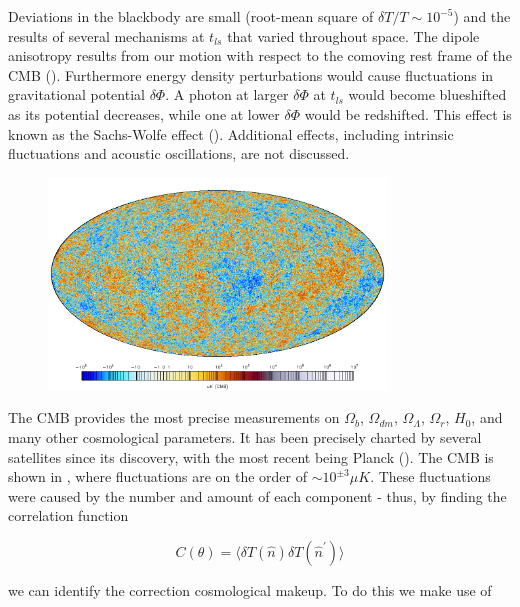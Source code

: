 Deviations in the blackbody are small (root-mean square of $\delta T/T \sim 10^{-5}$) and the results of several
mechanisms at $t_{ls}$ that varied throughout space.  The dipole anisotropy results from
our motion with respect to the comoving rest frame of the CMB ().  Furthermore
energy density perturbations would cause fluctuations in gravitational potential $\delta \Phi$.  A
photon at larger $\delta \Phi$ at $t_{ls}$ would become blueshifted as its
potential decreases, while one at lower $\delta \Phi$ would be redshifted.  This effect is known as the
Sachs-Wolfe effect ().  Additional effects, including intrinsic fluctuations and acoustic
oscillations, are not discussed.

\begin{figure}
	\centering
	\includegraphics[width=0.8\textwidth]{PlanckFig_map_columbi1_IDL_HighDR_colbar_1000px_CMB_moll}
	\label{fig:planck_map}
\end{figure}


The CMB provides the most precise measurements on $\Omega_{b}$, $\Omega_{dm}$, $\Omega_{\Lambda}$, $\Omega_{r}$,
$H_{0}$, and many other cosmological parameters.  It has been precisely charted by several satellites since its
discovery, with the most recent being Planck ().  The CMB is shown in ,
where fluctuations are on the order of $\sim 10^{\pm 3} \mu K$.  These fluctuations were caused by the number and
amount of each component - thus, by finding the correlation function

\begin{equation}
C(\theta) = \Big \langle \delta T( \hat{n}) \delta T(\hat{n}^\prime) \Big \rangle
\end{equation}

\noindent we can identify the correction cosmological makeup.  To do this we make use of

